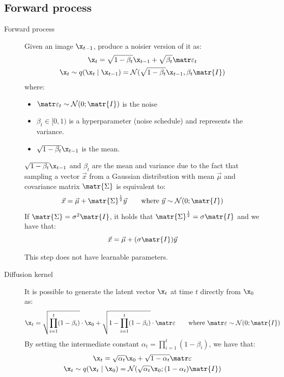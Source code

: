 \subsection{Forward process}

\begin{description}
    \item[Forward process] 
        Given an image $\x_{t-1}$, produce a noisier version of it as:
        \[ 
            \begin{gathered}
                \x_t = \sqrt{1-\beta_t} \x_{t-1} + \sqrt{\beta_t}\noise_t \\
                \x_t \sim q(\x_t \mid \x_{t-1}) = \mathcal{N}(\sqrt{1-\beta_t}\x_{t-1}, \beta_t\matr{I})
            \end{gathered}
        \]
        where:
        \begin{itemize}
            \item $\noise_t \sim \mathcal{N}(0; \matr{I})$ is the noise
            \item $\beta_t \in [0,1)$ is a hyperparameter (noise schedule) and represents the variance.
            \item $\sqrt{1-\beta_t} \x_{t-1}$ is the mean.
        \end{itemize}

        \begin{remark}
            $\sqrt{1-\beta_t} \x_{t-1}$ and $\beta_t$ are the mean and variance due to the fact that sampling a vector $\vec{x}$ from a Gaussian distribution with mean $\vec{\mu}$ and covariance matrix $\matr{\Sigma}$ is equivalent to:
            \[ \vec{x} = \vec{\mu} + \matr{\Sigma}^{\frac{1}{2}}\vec{y} \qquad \text{where } \vec{y} \sim \mathcal{N}(0; \matr{I}) \]
            If $\matr{\Sigma} = \sigma^2\matr{I}$, it holds that $\matr{\Sigma}^{\frac{1}{2}} = \sigma \matr{I}$ and we have that:
            \[ \vec{x} = \vec{\mu} + (\sigma\matr{I})\vec{y} \]
        \end{remark}

        \begin{remark}
            This step does not have learnable parameters.
        \end{remark}

    \item[Diffusion kernel] 
        It is possible to generate the latent vector $\x_t$ at time $t$ directly from $\x_0$ as:
        \[ \x_t = \sqrt{\prod_{i=1}^{t}(1-\beta_i)} \cdot \x_0 + \sqrt{1-\prod_{i=1}^{t}(1-\beta_i)} \cdot \noise \qquad \text{where } \noise \sim \mathcal{N}(0; \matr{I}) \]
        By setting the intermediate constant $\alpha_t = \prod_{i=1}^{t}(1-\beta_i)$, we have that:
        \[ 
            \begin{gathered}
                \x_t = \sqrt{\alpha_t} \x_0 + \sqrt{1-\alpha_t}\noise \\
                \x_t \sim q(\x_t \mid \x_0) = \mathcal{N}(\sqrt{\alpha_t}\x_0; (1-\alpha_t)\matr{I})
            \end{gathered}
        \]


\end{description}
